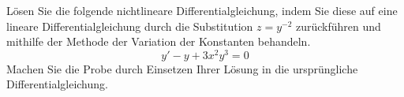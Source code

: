 \begin{atiTask}[
	title = Eine nichtlineare Differentialgleichung
]
	Lösen Sie die folgende nichtlineare Differentialgleichung, indem Sie diese auf eine lineare Differentialgleichung durch die Substitution $z = y^{-2}$ zurückführen und mithilfe der Methode der Variation der Konstanten behandeln.
	\[
		y' - y + 3x^2y^3 = 0
	\]
	Machen Sie die Probe durch Einsetzen Ihrer Lösung in die ursprüngliche Differentialgleichung.
\end{atiTask}